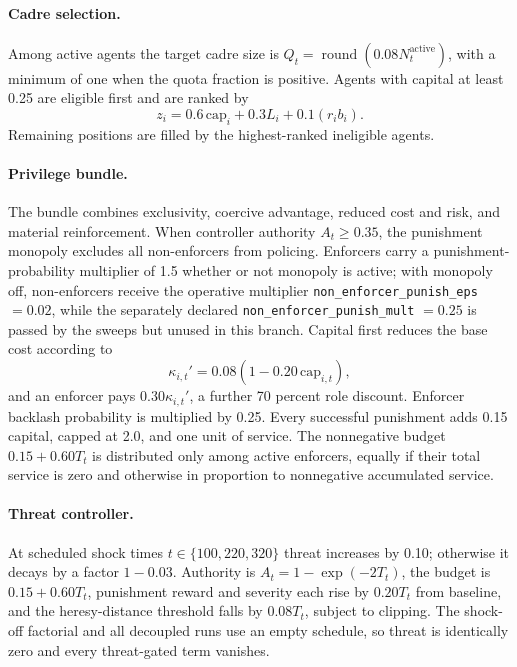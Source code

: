 \documentclass[12pt]{article}
\begin{document}
\paragraph{Cadre selection.} Among active agents the target cadre size is
\(Q_t=\operatorname{round}(0.08N_t^{\mathrm{active}})\), with a minimum of one
when the quota fraction is positive. Agents with capital at least 0.25 are
eligible first and are ranked by
\begin{equation}
 z_i=0.6\,\mathrm{cap}_i+0.3L_i+0.1(r_ib_i).
\end{equation}
Remaining positions are filled by the highest-ranked ineligible agents.

\paragraph{Privilege bundle.} The bundle combines exclusivity, coercive
advantage, reduced cost and risk, and material reinforcement. When controller
authority \(A_t\geq0.35\), the punishment monopoly excludes all non-enforcers
from policing. Enforcers carry a punishment-probability multiplier
of 1.5 whether or not monopoly is active; with monopoly off, non-enforcers
receive the operative multiplier \texttt{non\_enforcer\_punish\_eps} \(=0.02\),
while the separately declared \texttt{non\_enforcer\_punish\_mult} \(=0.25\) is
passed by the sweeps but unused in this branch. Capital first reduces the base
cost according to
\begin{equation}
 \kappa_{i,t}'=0.08\left(1-0.20\,\mathrm{cap}_{i,t}\right),
\end{equation}
and an enforcer pays \(0.30\kappa_{i,t}'\), a further 70 percent role discount.
Enforcer backlash probability is multiplied by 0.25. Every successful punishment
adds 0.15 capital, capped at 2.0, and one unit of service. The nonnegative
budget \(0.15+0.60T_t\) is distributed only among active enforcers, equally if
their total service is zero and otherwise in proportion to nonnegative
accumulated service.

\paragraph{Threat controller.} At scheduled shock times \(t\in\{100,220,320\}\)
threat increases by 0.10; otherwise it decays by a factor \(1-0.03\). Authority
is \(A_t=1-\exp(-2T_t)\), the budget is \(0.15+0.60T_t\), punishment reward and
severity each rise by \(0.20T_t\) from baseline, and the heresy-distance
threshold falls by \(0.08T_t\), subject to clipping. The shock-off factorial and
all decoupled runs use an empty schedule, so threat is identically zero and
every threat-gated term vanishes.
\end{document}
